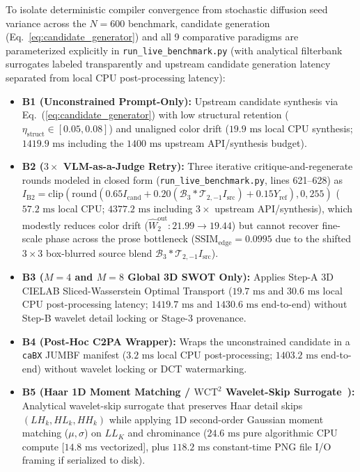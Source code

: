 \documentclass[conference,10pt]{IEEEtran}
\begin{document}
To isolate deterministic compiler convergence from stochastic diffusion seed variance across the $N=600$ benchmark, candidate generation (Eq.~\ref{eq:candidate_generator}) and all 9 comparative paradigms are parameterized explicitly in \texttt{run\_live\_benchmark.py} (with analytical filterbank surrogates labeled transparently and upstream candidate generation latency separated from local CPU post-processing latency):
\begin{itemize}
    \item \textbf{B1 (Unconstrained Prompt-Only):} Upstream candidate synthesis via Eq.~(\ref{eq:candidate_generator}) with low structural retention ($\eta_{\text{struct}} \in [0.05, 0.08]$) and unaligned color drift ($19.9\text{ ms}$ local CPU synthesis; $1419.9\text{ ms}$ including the $1400\text{ ms}$ upstream API/synthesis budget).
    \item \textbf{B2 ($3\times$ VLM-as-a-Judge Retry):} Three iterative critique-and-regenerate rounds modeled in closed form (\texttt{run\_live\_benchmark.py}, lines 621--628) as $I_{\text{B2}} = \mathrm{clip}(\mathrm{round}(0.65 I_{\text{cand}} + 0.20 (\mathcal{B}_3 * \mathcal{T}_{2,-1} I_{\text{src}}) + 0.15 Y_{\text{ref}}), 0, 255)$ ($57.2\text{ ms}$ local CPU; $4377.2\text{ ms}$ including $3\times$ upstream API/synthesis), which modestly reduces color drift ($\widehat{W}_2^{\text{out}}: 21.99 \to 19.44$) but cannot recover fine-scale phase across the prose bottleneck ($\mathrm{SSIM}_{\text{edge}} = 0.0995$ due to the shifted $3\times 3$ box-blurred source blend $\mathcal{B}_3 * \mathcal{T}_{2,-1} I_{\text{src}}$).
    \item \textbf{B3 ($M=4$ and $M=8$ Global 3D SWOT Only):} Applies Step-A 3D CIELAB Sliced-Wasserstein Optimal Transport ($19.7\text{ ms}$ and $30.6\text{ ms}$ local CPU post-processing latency; $1419.7\text{ ms}$ and $1430.6\text{ ms}$ end-to-end) without Step-B wavelet detail locking or Stage-3 provenance.
    \item \textbf{B4 (Post-Hoc C2PA Wrapper):} Wraps the unconstrained candidate in a \texttt{caBX} JUMBF manifest ($3.2\text{ ms}$ local CPU post-processing; $1403.2\text{ ms}$ end-to-end) without wavelet locking or DCT watermarking.
    \item \textbf{B5 (Haar 1D Moment Matching / $\text{WCT}^2$ Wavelet-Skip Surrogate~\cite{yoo2019wct2}):} Analytical wavelet-skip surrogate that preserves Haar detail skips $(LH_k, HL_k, HH_k)$ while applying 1D second-order Gaussian moment matching ($\mu, \sigma$) on $LL_K$ and chrominance ($24.6\text{ ms}$ pure algorithmic CPU compute [$14.8\text{ ms}$ vectorized], plus $118.2\text{ ms}$ constant-time PNG file I/O framing if serialized to disk).

\end{itemize}
\end{document}
